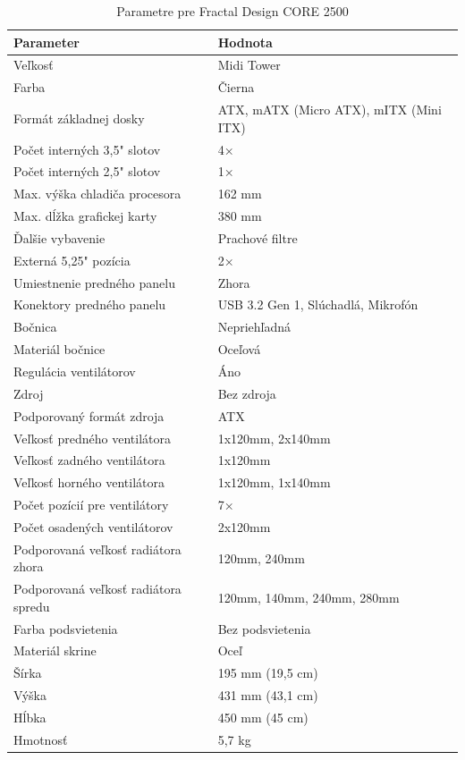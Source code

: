 \documentclass[12pt,oneside,slovak,a4paper]{article}
\begin{document}
\begin{table}[h]
\centering
\begin{tabular}{|l|l|}
\hline
\textbf{Parameter} & \textbf{Hodnota} \\ \hline
Veľkosť & Midi Tower \\ \hline
Farba & Čierna \\ \hline
Formát základnej dosky & ATX, mATX (Micro ATX), mITX (Mini ITX) \\ \hline
Počet interných 3,5" slotov & 4× \\ \hline
Počet interných 2,5" slotov & 1× \\ \hline
Max. výška chladiča procesora & 162 mm \\ \hline
Max. dĺžka grafickej karty & 380 mm \\ \hline
Ďalšie vybavenie & Prachové filtre \\ \hline
Externá 5,25" pozícia & 2× \\ \hline
Umiestnenie predného panelu & Zhora \\ \hline
Konektory predného panelu & USB 3.2 Gen 1, Slúchadlá, Mikrofón \\ \hline
Bočnica & Nepriehľadná \\ \hline
Materiál bočnice & Oceľová \\ \hline
Regulácia ventilátorov & Áno \\ \hline
Zdroj & Bez zdroja \\ \hline
Podporovaný formát zdroja & ATX \\ \hline
Veľkosť predného ventilátora & 1x120mm, 2x140mm \\ \hline
Veľkosť zadného ventilátora & 1x120mm \\ \hline
Veľkosť horného ventilátora & 1x120mm, 1x140mm \\ \hline
Počet pozícií pre ventilátory & 7× \\ \hline
Počet osadených ventilátorov & 2x120mm \\ \hline
Podporovaná veľkosť radiátora zhora & 120mm, 240mm \\ \hline
Podporovaná veľkosť radiátora spredu & 120mm, 140mm, 240mm, 280mm \\ \hline
Farba podsvietenia & Bez podsvietenia \\ \hline
Materiál skrine & Oceľ \\ \hline
Šírka & 195 mm (19,5 cm) \\ \hline
Výška & 431 mm (43,1 cm) \\ \hline
Hĺbka & 450 mm (45 cm) \\ \hline
Hmotnosť & 5,7 kg \\ \hline
\end{tabular}
\caption{Parametre pre Fractal Design CORE 2500}
\end{table}
\end{document}
